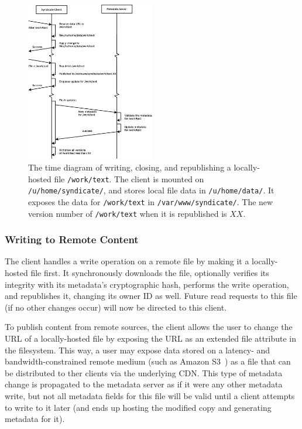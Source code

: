 \begin{figure}[h!]
\centering
\includegraphics[width=0.5\textwidth]{figures/write-operation}
\caption{The time diagram of writing, closing, and republishing a locally-hosted file \texttt{/work/text}.  The client is mounted on \texttt{/u/home/syndicate/}, and stores local file data in \texttt{/u/home/data/}.  It exposes the data for \texttt{/work/text} in \texttt{/var/www/syndicate/}.  The new version number of \texttt{/work/text} when it is republished is $XX$.}
\label{fig:write-operation}
\end{figure}


\subsubsection{Writing to Remote Content}

The client handles a write operation on a remote file by making it a
locally-hosted file first.  It synchronously downloads the file,
optionally verifies its integrity with its metadata's cryptographic
hash, performs the write operation, and republishes it, changing its
owner ID as well.  Future read requests to this file (if no other
changes occur) will now be directed to this client.

To publish content from remote sources, the client allows the user to
change the URL of a locally-hosted file by exposing the URL as an
extended file attribute in the filesystem.  This way, a user may
expose data stored on a latency- and bandwidth-constrained remote
medium (such as Amazon S3~\cite{S3}) as a file that can be
distributed to ther clients via the underlying CDN.  This type of
metadata change is propagated to the metadata server as if it were any
other metadata write, but not all metadata fields for this file will
be valid until a client attempts to write to it later (and ends up
hosting the modified copy and generating metadata for it).


